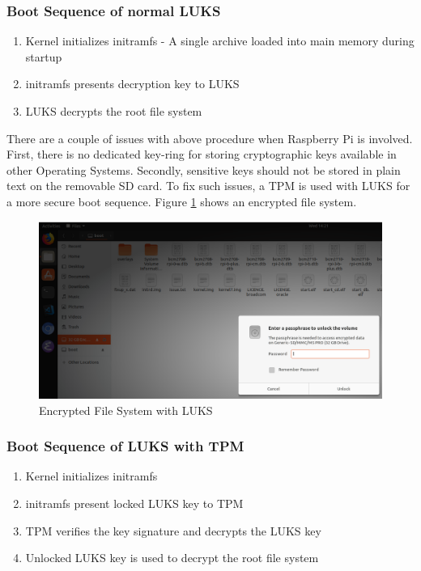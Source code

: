 \documentclass[11pt,openright]{report}
\begin{document}
\subsubsection{Boot Sequence of normal LUKS}
\begin{enumerate}
	\item Kernel initializes initramfs - A single archive loaded into main memory during startup
	\item initramfs presents decryption key to LUKS
	\item LUKS decrypts the root file system
\end{enumerate}

There are a couple of issues with above procedure when Raspberry Pi is involved. First, there is no dedicated key-ring for storing cryptographic keys available in other Operating Systems. Secondly, sensitive keys should not be stored in plain text on the removable SD card. To fix such issues, a TPM is used with LUKS \cite{TPMLUKS} for a more secure boot sequence. Figure \ref{fig:encrypted_fs} shows an encrypted file system.
\newpage
\hfill\\
\begin{figure}[!htbp]
    \centering
    \includegraphics[scale=0.5]{images/2_LUKSEncryptedFormat.png}
    \caption{Encrypted File System with LUKS}
    \label{fig:encrypted_fs}
\end{figure}
\newline
\newline
\subsubsection{Boot Sequence of LUKS with TPM}
\begin{enumerate}
	\item Kernel initializes initramfs
	\item initramfs present locked LUKS key to TPM
	\item TPM verifies the key signature and decrypts the LUKS key
	\item Unlocked LUKS key is used to decrypt the root file system
\end{enumerate}
\end{document}
